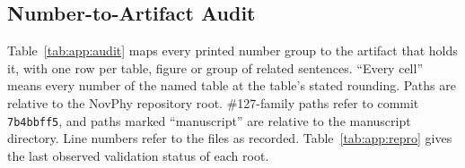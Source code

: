\subsection{Number-to-Artifact Audit}
\label{sec:app:audit}

\begin{revblock}
Table~\ref{tab:app:audit} maps every printed number group to the artifact that holds it, with one row per table, figure or group of related sentences. ``Every cell'' means every number of the named table at the table's stated rounding. Paths are relative to the NovPhy repository root. \#127-family paths refer to commit \texttt{7b4bbff5}, and paths marked ``manuscript'' are relative to the manuscript directory. Line numbers refer to the files as recorded. Table~\ref{tab:app:repro} gives the last observed validation status of each root.
\end{revblock}

